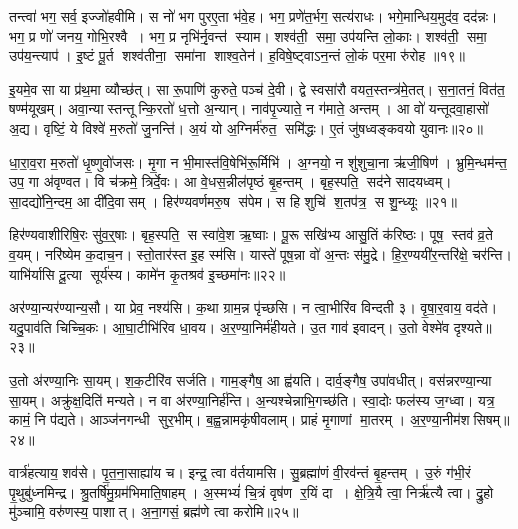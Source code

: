 तन्त्वा॑ भग॒ सर्व॒ इज्जो॑हवीमि।
स नो॑ भग पुरए॒ता भ॑वे॒ह।
भग॒ प्रणे॑त॒र्भग॒ सत्य॑राधः।
भगे॒मान्धिय॒मुद॑व॒ दद॑न्नः।
भग॒ प्र णो॑ जनय॒ गोभि॒रश्वै।
भग॒ प्र नृभि॑र्नृ॒वन्त॑ स्याम।
शश्व॑ती॒ समा॒ उप॑यन्ति लो॒काः।
शश्व॑ती॒ समा॒ उप॑य॒न्त्याप॑।
इ॒ष्टं पू॒र्त शश्व॑तीना॒ समा॑ना शाश्व॒तेन॑।
ह॒विषे॒ष्ट्वाऽन॒न्तं लो॒कं पर॒मा रु॑रोह ॥१९॥

इ॒यमे॒व सा या प्र॑थ॒मा व्यौच्छ॑त्।
सा रू॒पाणि॑ कुरुते॒ पञ्च॑ दे॒वी।
द्वे स्वसा॑रौ वयत॒स्तन्त्र॑मे॒तत्।
स॒ना॒तनं॒ वित॑त॒ षण्म॑यूखम्।
अवा॒न्यास्तन्तून्कि॒रतो॑ ध॒त्तो अ॒न्यान्।
नाव॑पृ॒ज्याते॒ न ग॑माते॒ अन्तम्।
आ वो॑ यन्तूदवा॒हासो॑ अ॒द्य।
वृष्टिं॒ ये विश्वे॑ म॒रुतो॑ जु॒नन्ति॑।
अ॒यं यो अ॒ग्निर्म॑रुत॒ समि॑द्धः।
ए॒तं जु॑षध्वङ्कवयो युवानः॥२०॥

धा॒रा॒व॒रा म॒रुतो॑ धृ॒ष्णुवो॑जसः।
मृ॒गा न भी॒मास्त॑वि॒षेभि॑रू॒र्मिभि॑।
अ॒ग्नयो॒ न शु॑शुचा॒ना ऋ॑जी॒षिण॑।
भ्रुमि॒न्धम॑न्त॒ उप॒ गा अ॑वृण्वत।
वि च॑क्रमे॒ त्रिर्दे॒वः।
आ वे॒धस॒न्नील॑पृष्ठं बृ॒हन्तम्।
बृह॒स्पति॒ सद॑ने सादयध्वम्।
सा॒दद्यो॑नि॒न्दम॒ आ दी॑दि॒वासम्।
हिर॑ण्यवर्णमरु॒ष स॑पेम।
स हि शुचि॑ श॒तप॑त्र॒ स शु॒न्ध्यूः ॥२१॥

हिर॑ण्यवाशीरिषि॒रः सु॑व॒र्॒षाः।
बृह॒स्पति॒ स स्वा॑वे॒श ऋ॒ष्वाः।
पू॒रू सखि॑भ्य आसु॒तिं क॑रिष्ठः।
पूष॒ स्तव॑ व्र॒ते व॒यम्।
नरि॑ष्येम क॒दाच॒न।
स्तो॒तार॑स्त इ॒ह स्म॑सि।
यास्ते॑ पूष॒न्ना वो॑ अ॒न्तः स॑मु॒द्रे।
हि॒र॒ण्ययी॑र॒न्तरि॑क्षे॒ चर॑न्ति।
याभि॑र्यासि दू॒त्या सूर्य॑स्य।
कामे॑न कृ॒तश्रव॑ इ॒च्छमा॑नः॥२२॥

अर॑ण्या॒न्यर॑ण्यान्य॒सौ।
या प्रेव॒ नश्य॑सि।
क॒था ग्राम॒न्न पृ॑च्छसि।
न त्वा॒भीरि॑व विन्दती ३।
वृ॒षा॒र॒वाय॒ वद॑ते।
यदु॒पाव॑ति चिच्चि॒कः।
आ॒घा॒टीभि॑रिव धा॒वय\sn{}।
अ॒र॒ण्या॒निर्म॑हीयते।
उ॒त गाव॑ इवादन्।
उ॒तो वेश्मे॑व दृश्यते॥२३॥

उ॒तो अ॑रण्या॒निः सा॒यम्।
श॒क॒टीरि॑व सर्जति।
गाम॒ङ्गैष॒ आ ह्व॑यति।
दार्व॒ङ्गैष॒ उपा॑वधीत्।
वस॑न्नरण्या॒न्या सा॒यम्।
अक्रु॑क्ष॒दिति॑ मन्यते।
न वा अ॑रण्या॒निर्\mbox{}ह॑न्ति।
अ॒न्यश्चेन्नाभि॒गच्छ॑ति।
स्वा॒दोः फल॑स्य ज॒ग्ध्वा।
यत्र॒ कामं॒ नि प॑द्यते।
आञ्ज॑नगन्धी सुर॒भीम्।
ब॒ह्व॒न्नामकृ॑षीवलाम्।
प्राहं मृ॒गाणां मा॒तरम्।
अ॒र॒ण्या॒नीम॑शसिषम्॥२४॥\anuvakamend[स्या॒म॒ रु॒रो॒ह॒ यु॒वा॒न॒ शु॒न्ध्यूरि॒च्छमा॑नो दृश्यते॒ निप॑द्यते च॒त्वारि॑ च]

वार्त्र॑हत्याय॒ शव॑से।
पृ॒त॒ना॒साह्या॑य च।
इन्द्र॒ त्वा व॑र्तयामसि।
सु॒ब्रह्मा॑णं वी॒रव॑न्तं बृ॒हन्तम्।
उ॒रुं ग॑भी॒रं पृ॒थुबु॑ध्नमिन्द्र।
श्रु॒तर्\mbox{}षि॑मु॒ग्रम॑भिमाति॒षाहम्।
अ॒स्मभ्यं॑ चि॒त्रं वृष॑ण र॒यिं दा।
क्षे॒त्रि॒यै त्वा॒ निर्\mbox{}ऋ॑त्यै त्वा।
द्रु॒हो मु॑ञ्चामि॒ वरु॑णस्य॒ पाशात्।
अ॒ना॒गसं॒ ब्रह्म॑णे त्वा करोमि॥२५॥

